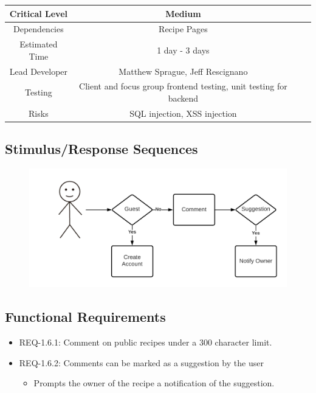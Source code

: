 \documentclass{scrreprt}
\begin{document}
\begin{center}
    \begin{tabular}{| c | c | c | c |}
        \hline
        Critical Level & Medium                                                            \\
        \hline
        Dependencies   & Recipe Pages                                                      \\
        \hline
        Estimated Time & 1 day - 3 days                                                    \\
        \hline
        Lead Developer & Matthew Sprague, Jeff Rescignano                           \\
        \hline
        Testing         & Client and focus group \gls{frontend} testing,
                          \gls{unit testing} for \gls{backend}                             \\
        \hline
        Risks          & \gls{SQL injection}, \gls{XSS injection}                          \\
        \hline
    \end{tabular}
\end{center}

\subsection{Stimulus/Response Sequences}

\begin{figure}[H]\centering
    \includegraphics[width=\columnwidth]{FlowCharts/Recipe-Commenting.png}
\end{figure}

\subsection{\gls{Functional Requirements}}

\begin{itemize}
    \item REQ-1.6.1: Comment on public recipes under a 300 character limit.
    \item REQ-1.6.2: Comments can be marked as a suggestion by the user
          \begin{itemize}
              \item Prompts the owner of the recipe a notification of the suggestion.
          \end{itemize}
\end{itemize}
\end{document}
